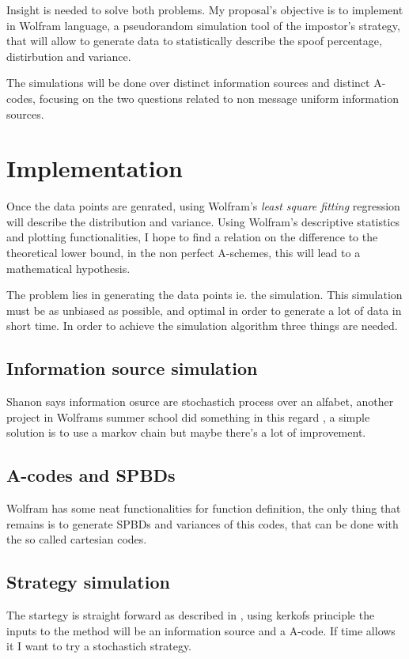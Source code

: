 \documentclass[conference]{IEEEtran}
\begin{document}
Insight is needed to solve both problems. My proposal's objective is to implement in Wolfram language, a pseudorandom simulation tool of the impostor's strategy, that will allow to generate data to statistically describe the spoof percentage, distirbution and variance.

The simulations will be done over distinct information sources and distinct A-codes, focusing on the two questions related to non message uniform information sources.

%
%
\section{Implementation}
Once the data points are genrated, using Wolfram's \textit{least square fitting} regression will describe the distribution and variance. Using Wolfram's descriptive statistics and plotting functionalities, I hope to find a relation on the difference to the theoretical lower bound, in the non perfect A-schemes, this will lead to a mathematical hypothesis.

The problem lies in generating the data points ie. the simulation. This simulation must be as unbiased as possible, and optimal in order to generate a lot of data in short time. In order to achieve the simulation algorithm three things are needed.

\subsection{Information source simulation}
Shanon says information osurce are stochastich process over an alfabet, another project in Wolframs summer school did something in this regard \cite{b5}, a simple solution is to use a markov chain but maybe there's a lot of improvement.

\subsection{A-codes and SPBDs}
Wolfram has some neat functionalities for function definition, the only thing that remains is to generate SPBDs and variances of this codes, that can be done with the so called cartesian codes.

\subsection{Strategy simulation}
The startegy is straight forward as described in \cite{b6}, using kerkofs principle the inputs to the method will be an information source and a A-code.
If time allows it I want to try a stochastich strategy.
\end{document}
